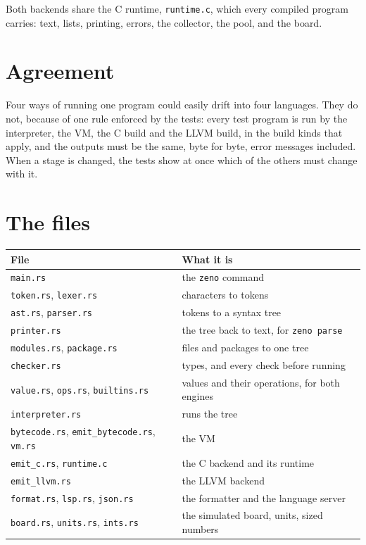 Both backends share the C runtime, \verb|runtime.c|, which every
compiled program carries: text, lists, printing, errors, the collector,
the pool, and the board.

\section{Agreement}

Four ways of running one program could easily drift into four
languages. They do not, because of one rule enforced by the tests:
every test program is run by the interpreter, the VM, the C build and
the LLVM build, in the build kinds that apply, and the outputs must be
the same, byte for byte, error messages included. When a stage is
changed, the tests show at once which of the others must change with
it.

\section{The files}

\begin{center}
\begin{tabular}{lP{8.4cm}}
\toprule
File & What it is \\
\midrule
\verb|main.rs| & the \verb|zeno| command \\
\verb|token.rs|, \verb|lexer.rs| & characters to tokens \\
\verb|ast.rs|, \verb|parser.rs| & tokens to a syntax tree \\
\verb|printer.rs| & the tree back to text, for \verb|zeno parse| \\
\verb|modules.rs|, \verb|package.rs| & files and packages to one tree \\
\verb|checker.rs| & types, and every check before running \\
\verb|value.rs|, \verb|ops.rs|, \verb|builtins.rs| & values and their operations, for both engines \\
\verb|interpreter.rs| & runs the tree \\
\verb|bytecode.rs|, \verb|emit_bytecode.rs|, \verb|vm.rs| & the VM \\
\verb|emit_c.rs|, \verb|runtime.c| & the C backend and its runtime \\
\verb|emit_llvm.rs| & the LLVM backend \\
\verb|format.rs|, \verb|lsp.rs|, \verb|json.rs| & the formatter and the language server \\
\verb|board.rs|, \verb|units.rs|, \verb|ints.rs| & the simulated board, units, sized numbers \\
\bottomrule
\end{tabular}
\end{center}

